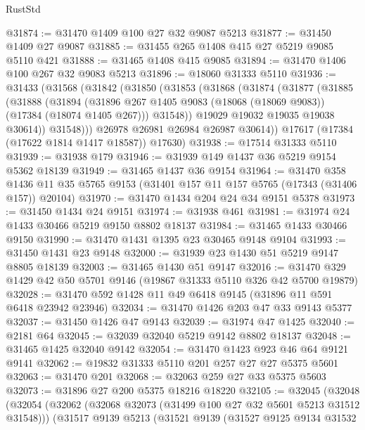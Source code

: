 \begin{lexlean}{RustStd}
\begin{coremodule}
@31874 := @31470 @1409 @100 @27 @32 @9087 @5213
@31877 := @31450 @1409 @27 @9087
@31885 := @31455 @265 @1408 @415 @27 @5219 @9085 @5110 @421
@31888 := @31465 @1408 @415 @9085
@31894 := @31470 @1406 @100 @267 @32 @9083 @5213
@31896 := @18060 @31333 @5110
@31936 := @31433
    (@31568
      (@31842
        (@31850
          (@31853
            (@31868
              (@31874
                (@31877
                  (@31885
                    (@31888
                      (@31894
                        (@31896
                          @267
                          @1405
                          @9083
                          (@18068 (@18069 @9083))
                          (@17384 (@18074 @1405 @267)))
                        @31548))
                    @19029
                    @19032
                    @19035
                    @19038
                    @30614))
                @31548)))
          @26978
          @26981
          @26984
          @26987
          @30614))
      @17617
      (@17384 (@17622 @1814 @1417 @18587))
      @17630)
@31938 := @17514 @31333 @5110
@31939 := @31938 @179
@31946 := @31939 @149 @1437 @36 @5219 @9154 @5362 @18139
@31949 := @31465 @1437 @36 @9154
@31964 := @31470
    @358
    @1436
    @11
    @35
    @5765
    @9153
    (@31401 @157 @11 @157 @5765 (@17343 (@31406 @157)) @20104)
@31970 := @31470 @1434 @204 @24 @34 @9151 @5378
@31973 := @31450 @1434 @24 @9151
@31974 := @31938 @461
@31981 := @31974 @24 @1433 @30466 @5219 @9150 @8802 @18137
@31984 := @31465 @1433 @30466 @9150
@31990 := @31470 @1431 @1395 @23 @30465 @9148 @9104
@31993 := @31450 @1431 @23 @9148
@32000 := @31939 @23 @1430 @51 @5219 @9147 @8805 @18139
@32003 := @31465 @1430 @51 @9147
@32016 := @31470 @329 @1429 @42 @50 @5701 @9146 (@19867 @31333 @5110 @326 @42 @5700 @19879)
@32028 := @31470 @592 @1428 @11 @49 @6418 @9145 (@31896 @11 @591 @6418 @23942 @23946)
@32034 := @31470 @1426 @203 @47 @33 @9143 @5377
@32037 := @31450 @1426 @47 @9143
@32039 := @31974 @47 @1425
@32040 := @2181 @64
@32045 := @32039 @32040 @5219 @9142 @8802 @18137
@32048 := @31465 @1425 @32040 @9142
@32054 := @31470 @1423 @923 @46 @64 @9121 @9141
@32062 := @19832 @31333 @5110 @201 @257 @27 @27 @5375 @5601
@32063 := @31470 @201
@32068 := @32063 @259 @27 @33 @5375 @5603
@32073 := @31896 @27 @200 @5375 @18216 @18220
@32105 := @32045
    (@32048
      (@32054
        (@32062 (@32068 @32073 (@31499 @100 @27 @32 @5601 @5213 @31512 @31548)))
        (@31517
          @9139
          @5213
          (@31521
            @9139
            (@31527
              @9125
              @9134
              @31532

\end{coremodule}
\end{lexlean}
